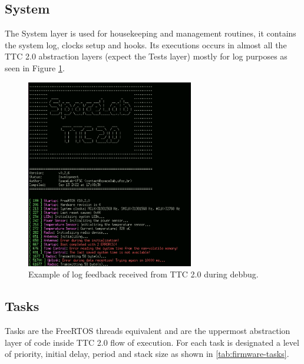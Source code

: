 \subsection{System}

The System layer is used for housekeeping and management routines, it contains the system log, clocks setup and hooks. Its executions occurs in almost all the TTC 2.0 abstraction layers (expect the Tests layer) mostly for log purposes as seen in Figure \ref{fig:log_info}.

\begin{figure}[!h]
	\begin{center}
		\includegraphics[width=0.65\textwidth]{figures/ttc2-terminal-log.png}
		\caption{Example of log feedback received from TTC 2.0 during debbug.}
		\label{fig:log_info}
	\end{center}
\end{figure}

\subsection{Tasks}

Tasks are the FreeRTOS threads equivalent and are the uppermost abstraction layer of code inside TTC 2.0 flow of execution. For each task is designated a level of priority, initial delay, period and stack size as shown in \autoref{tab:firmware-tasks}.

